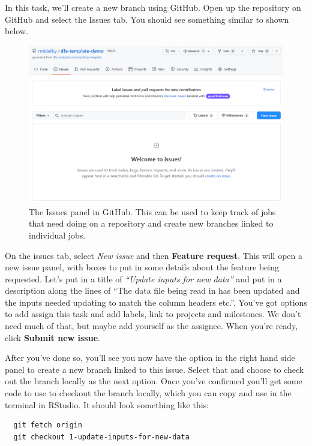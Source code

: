 \documentclass[
  12pt,
]{article}
\begin{document}
In this task, we'll create a new branch using GitHub. Open up the
repository on GitHub and select the Issues tab. You should see something
similar to shown below.

\begin{figure}

{\centering \includegraphics[width=0.92\linewidth]{images/gitdemo/gitdemo-GitHub-Issues} 

}

\caption{The Issues panel in GitHub. This can be used to keep track of jobs that need doing on a repository and create new branches linked to individual jobs.}\label{fig:unnamed-chunk-10}
\end{figure}

On the issues tab, select \emph{New issue} and then \textbf{Feature
request}. This will open a new issue panel, with boxes to put in some
details about the feature being requested. Let's put in a title of
\emph{``Update inputs for new data''} and put in a description along the
lines of ``The data file being read in has been updated and the inputs
needed updating to match the column headers etc.''. You've got options
to add assign this task and add labels, link to projects and milestones.
We don't need much of that, but maybe add yourself as the assignee. When
you're ready, click \textbf{Submit new issue}.

After you've done so, you'll see you now have the option in the right
hand side panel to create a new branch linked to this issue. Select that
and choose to check out the branch locally as the next option. Once
you've confirmed you'll get some code to use to checkout the branch
locally, which you can copy and use in the terminal in RStudio. It
should look something like this:

\begin{verbatim}
  git fetch origin
  git checkout 1-update-inputs-for-new-data
\end{verbatim}
\end{document}
